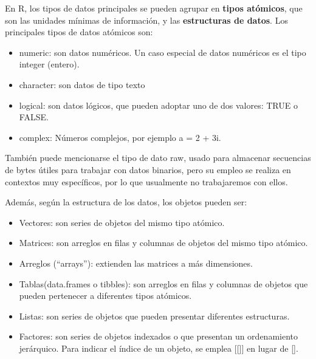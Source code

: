 \documentclass[
  spanish,
  letterpaper,
  DIV=11,
  numbers=noendperiod]{scrreprt}
\begin{document}
\begin{tcolorbox}[enhanced jigsaw, arc=.35mm, bottomrule=.15mm, bottomtitle=1mm, breakable, colback=white, colbacktitle=quarto-callout-note-color!10!white, colframe=quarto-callout-note-color-frame, coltitle=black, left=2mm, leftrule=.75mm, opacityback=0, opacitybacktitle=0.6, rightrule=.15mm, title=\textcolor{quarto-callout-note-color}{\faInfo}\hspace{0.5em}{Tipos de datos}, titlerule=0mm, toprule=.15mm, toptitle=1mm]

En R, los tipos de datos principales se pueden agrupar en \textbf{tipos
atómicos}, que son las unidades mínimas de información, y las
\textbf{estructuras de datos}. Los principales tipos de datos atómicos
son:

\begin{itemize}
\item
  numeric: son datos numéricos. Un caso especial de datos numéricos es
  el tipo integer (entero).
\item
  character: son datos de tipo texto
\item
  logical: son datos lógicos, que pueden adoptar uno de dos valores:
  TRUE o FALSE.
\item
  complex: Números complejos, por ejemplo a = 2 + 3i.
\end{itemize}

También puede mencionarse el tipo de dato raw, usado para almacenar
secuencias de bytes útiles para trabajar con datos binarios, pero su
empleo se realiza en contextos muy específicos, por lo que usualmente no
trabajaremos con ellos.

Además, según la estructura de los datos, los objetos pueden ser:

\begin{itemize}
\item
  Vectores: son series de objetos del mismo tipo atómico.
\item
  Matrices: son arreglos en filas y columnas de objetos del mismo tipo
  atómico.
\item
  Arreglos (``arrays''): extienden las matrices a más dimensiones.
\item
  Tablas(data.frames o tibbles): son arreglos en filas y columnas de
  objetos que pueden pertenecer a diferentes tipos atómicos.
\item
  Listas: son series de objetos que pueden presentar diferentes
  estructuras.
\item
  Factores: son series de objetos indexados o que presentan un
  ordenamiento jerárquico. Para indicar el índice de un objeto, se
  emplea {[}{[}{]}{]} en lugar de {[}{]}.
\end{itemize}

\end{tcolorbox}
\end{document}
